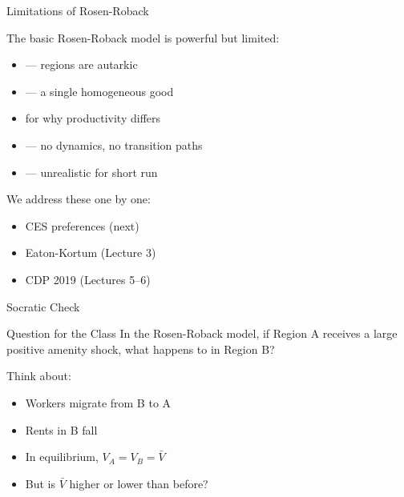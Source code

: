 \documentclass{beamer}
\begin{document}
\begin{frame}{Limitations of Rosen-Roback}

    The basic Rosen-Roback model is powerful but limited:

    \vspace{0.5em}
    \begin{itemize}
        \item {} --- regions are autarkic
        \item {} --- a single homogeneous good
        \item {} for why productivity differs
        \item {} --- no dynamics, no transition paths
        \item {} --- unrealistic for short run
    \end{itemize}

    \vspace{0.5em}
    We address these one by one:
    \begin{itemize}
        \item {} CES preferences (next)
        \item {} Eaton-Kortum (Lecture 3)
        \item {} CDP 2019 (Lectures 5--6)
    \end{itemize}

\end{frame}

\begin{frame}{Socratic Check}

    \begin{block}{Question for the Class}
        In the Rosen-Roback model, if Region A receives a large positive amenity shock, what happens to  in Region B?
    \end{block}

    \vspace{1em}
    Think about:
    \begin{itemize}
        \item Workers migrate from B to A
        \item Rents in B fall
        \item In equilibrium, $V_A = V_B = \bar{V}$
        \item But is $\bar{V}$ higher or lower than before?
    \end{itemize}

    \vspace{0.5em}

\end{frame}
\end{document}
